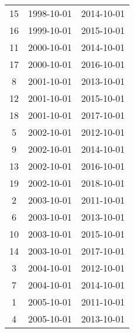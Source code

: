 % 
\begin{tabular}{ccc}
  \hline
  \hline
15 & 1998-10-01 & 2014-10-01 \\ 
  16 & 1999-10-01 & 2015-10-01 \\ 
  11 & 2000-10-01 & 2014-10-01 \\ 
  17 & 2000-10-01 & 2016-10-01 \\ 
  8 & 2001-10-01 & 2013-10-01 \\ 
  12 & 2001-10-01 & 2015-10-01 \\ 
  18 & 2001-10-01 & 2017-10-01 \\ 
  5 & 2002-10-01 & 2012-10-01 \\ 
  9 & 2002-10-01 & 2014-10-01 \\ 
  13 & 2002-10-01 & 2016-10-01 \\ 
  19 & 2002-10-01 & 2018-10-01 \\ 
  2 & 2003-10-01 & 2011-10-01 \\ 
  6 & 2003-10-01 & 2013-10-01 \\ 
  10 & 2003-10-01 & 2015-10-01 \\ 
  14 & 2003-10-01 & 2017-10-01 \\ 
  3 & 2004-10-01 & 2012-10-01 \\ 
  7 & 2004-10-01 & 2014-10-01 \\ 
  1 & 2005-10-01 & 2011-10-01 \\ 
  4 & 2005-10-01 & 2013-10-01 \\ 
   \hline
\end{tabular}
